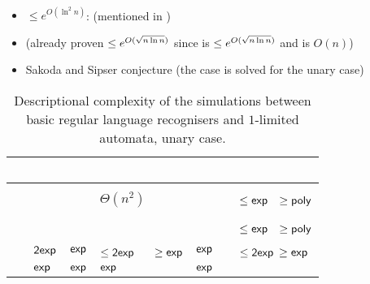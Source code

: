 \paragraph{\TNFA{}\tto\TDFA}\label{cost:2NFAto2DFAu}
\begin{itemize}
	\item $\le e^{O(\ln^2n)}$: \cite{GefMer+03} (mentioned in \cite{Pig15})
	\item (already proven $\le\CsubLe$ since \hyperref[cost:2NFAto1DFAu]{\TNFA{}\tto\ODFA} is $\le\CsubLe$ and \ODFA{}\tto\TDFA is $O(n)$)
	\item Sakoda and Sipser conjecture (the case \hyperref[cost:1NFAto2DFAu]{\ONFA{}\tto\TDFA} is solved for the unary case)
\end{itemize}


\begin{table}
	\centering
	\renewcommand{\arraystretch}{1.2}
	\renewcommand{\hstdef}{.55}
	\begin{tabular}{|l|l|l|p{4.3em}|l|l|p{3.1em}|}
		\hline
		~     & \ODFA           & \ONFA           & \TDFA                                            & \TNFA   & \OLA   & \ODLA                          \\ \hline
		\ODFA & \cY             & \Ctriv          & \Ctriv                                           & \Ctriv  & \Ctriv & \Ctriv                         \\ \hline
		\ONFA & \rbt{$\CsubEq$} & \cY             & \cR $\Theta(n^2)$                                & \Ctriv  & \Ctriv & \cB $\le\Cexp\hst$ $\ge\Cpoly$ \\ \hline
		\TDFA & \rbt{$\CsubEq$} & \rbt{$\CsubEq$} & \cY                                              & \Ctriv  & \Ctriv & \Ctriv                         \\ \hline
		\TNFA & \rbt{$\CsubEq$} & \rbt{$\CsubEq$} & \cR \rbt[.4]{$\le\Csubln$} \rbt[.3]{$\ge\Cpoly$} & \cY     & \Ctriv & \cB $\le\Cexp\hst$ $\ge\Cpoly$ \\ \hline
		\OLA  & $\Cdexp$        & $\Cexp$         & \cG $\le\Cdexp\hst[1.25]$ $\ge\Cexp$             & $\Cexp$ & \cY    & \cG $\le\Cdexp$ $\ge\Cexp$     \\ \hline
		\ODLA & $\Cexp$         & $\Cexp$         & $\Cexp$                                          & $\Cexp$ & \Ctriv & \cY                            \\ \hline
	\end{tabular}
	\caption{Descriptional complexity of the simulations between basic regular language recognisers and $1$-limited automata, unary case.}
	\label{tab:sims-1la-unary}
\end{table}

